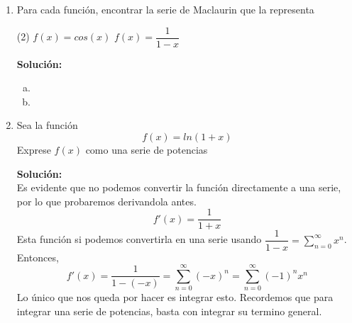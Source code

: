 \documentclass[12pt]{article}
\newenvironment{solucion}
{\begin{mdframed}[backgroundcolor=black!10]
		{\bf Solución:}\\
	}
	{
	\end{mdframed}
}
\newenvironment{preguntas}
{\begin{enumerate}\itemsep12pt
	}
	{
	\end{enumerate}
}
\begin{document}
\begin{preguntas}
\item Para cada función, encontrar la serie de Maclaurin que la representa
\begin{tasks}(2)
\task $f(x) = cos(x)$
\task $f(x) = \dfrac{1}{1-x}$
\end{tasks}
\begin{solucion}

\begin{enumerate}[a)]
\item 
\item 
\end{enumerate}
\end{solucion}
\item Sea la función
	$$f(x) = ln(1+x)$$
	Exprese $f(x)$ como una serie de potencias
\begin{solucion}
Es evidente que no podemos convertir la función directamente a una serie, por lo que probaremos derivandola antes.
		$$f'(x) = \dfrac{1}{1+x}$$
		Esta función si podemos convertirla en una serie usando $\dfrac{1}{1-x} = \sum\limits_{n=0}^{\infty} x^n$. Entonces,
		$$f'(x) = \dfrac{1}{1-(-x)} 
		= \sum\limits_{n=0}^{\infty} (-x)^n
		= \sum\limits_{n=0}^{\infty} (-1)^n x^n$$
		Lo único que nos queda por hacer es integrar esto. Recordemos que para integrar una serie de potencias, basta con integrar su termino general.
		

\end{solucion}
\end{preguntas}
\end{document}
